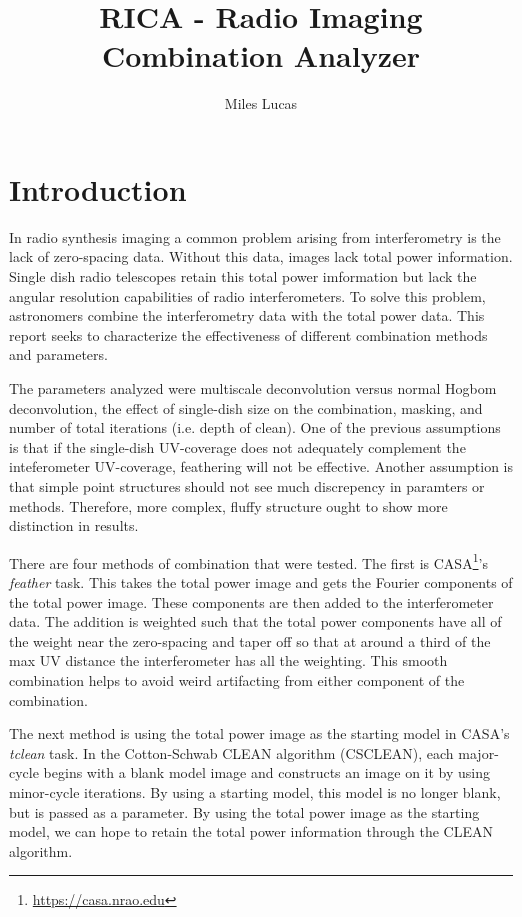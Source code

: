 \documentclass[manuscript,linenumbers]{aastex62}
\begin{document}
\title{RICA - Radio Imaging Combination Analyzer}
\author{Miles Lucas}
 

\begin{abstract}

\end{abstract}

\section{Introduction}

In radio synthesis imaging a common problem arising from interferometry is the lack of zero-spacing data. Without this data, images lack total power information. Single dish radio telescopes retain this total power imformation but lack the angular resolution capabilities of radio interferometers. To solve this problem, astronomers combine the interferometry data with the total power data. This report seeks to characterize the effectiveness of different combination methods and parameters.

The parameters analyzed were multiscale deconvolution versus normal Hogbom deconvolution, the effect of single-dish size on the combination, masking, and number of total iterations (i.e. depth of clean). One of the previous assumptions is that if the single-dish UV-coverage does not adequately complement the inteferometer UV-coverage, feathering will not be effective. Another assumption is that simple point structures should not see much discrepency in paramters or methods. Therefore, more complex, fluffy structure ought to show more distinction in results.

There are four methods of combination that were tested. The first is CASA\footnote{\url{https://casa.nrao.edu}}'s \textit{feather} task. This takes the total power image and gets the Fourier components of the total power image. These components are then added to the interferometer data. The addition is weighted such that the total power components have all of the weight near the zero-spacing and taper off so that at around a third of the max UV distance the interferometer has all the weighting. This smooth combination helps to avoid weird artifacting from either component of the combination.

The next method is using the total power image as the starting model in CASA's \textit{tclean} task. In the Cotton-Schwab CLEAN algorithm (CSCLEAN), each major-cycle begins with a blank model image and constructs an image on it by using minor-cycle iterations. By using a starting model, this model is no longer blank, but is passed as a parameter. By using the total power image as the starting model, we can hope to retain the total power information through the CLEAN algorithm.
\end{document}
